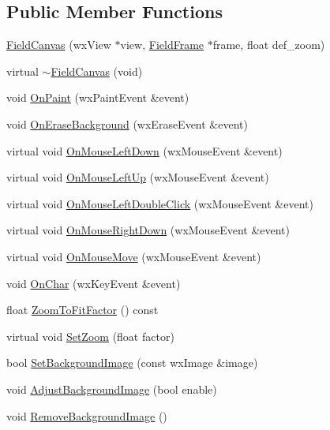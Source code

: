 \subsection*{Public Member Functions}
\begin{DoxyCompactItemize}
\item 
\hyperlink{a00101_a041189542b2fe164a1b1a13484cfdb3e}{Field\-Canvas} (wx\-View $\ast$view, \hyperlink{a00102}{Field\-Frame} $\ast$frame, float def\-\_\-zoom)
\item 
virtual \hyperlink{a00101_a69a815dd136fbc192be653bd561d9e45}{$\sim$\-Field\-Canvas} (void)
\item 
void \hyperlink{a00101_a0912d760e90bcd900ffcae4665b3dbd4}{On\-Paint} (wx\-Paint\-Event \&event)
\item 
void \hyperlink{a00101_a415abde6a22a5e8427dd6b274466b1fe}{On\-Erase\-Background} (wx\-Erase\-Event \&event)
\item 
virtual void \hyperlink{a00101_a1edd2bb8c1fe0356126cf6fb014d3611}{On\-Mouse\-Left\-Down} (wx\-Mouse\-Event \&event)
\item 
virtual void \hyperlink{a00101_a1e5d88baede48dc92fe2e904287f8a5b}{On\-Mouse\-Left\-Up} (wx\-Mouse\-Event \&event)
\item 
virtual void \hyperlink{a00101_a38d68c5f1458ac728df832ceb8ebda36}{On\-Mouse\-Left\-Double\-Click} (wx\-Mouse\-Event \&event)
\item 
virtual void \hyperlink{a00101_a0425e5b286913746da50af63000acab0}{On\-Mouse\-Right\-Down} (wx\-Mouse\-Event \&event)
\item 
virtual void \hyperlink{a00101_a990ffe3bd8a0402c60a3a497f4e66501}{On\-Mouse\-Move} (wx\-Mouse\-Event \&event)
\item 
void \hyperlink{a00101_a241ade9f268bcdfce766de8178aa7a9a}{On\-Char} (wx\-Key\-Event \&event)
\item 
float \hyperlink{a00101_abef5f32425f5f6a4c4623d161e36acec}{Zoom\-To\-Fit\-Factor} () const 
\item 
virtual void \hyperlink{a00101_ac4260b49b302d3d7009fad67ac1775de}{Set\-Zoom} (float factor)
\item 
bool \hyperlink{a00101_afdb191feba34784ac967d08755e44df5}{Set\-Background\-Image} (const wx\-Image \&image)
\item 
void \hyperlink{a00101_a75a40b62efa675cb92871bee42b43637}{Adjust\-Background\-Image} (bool enable)
\item 
void \hyperlink{a00101_ad164d99c8a4cf72038e532aaacc0cf9a}{Remove\-Background\-Image} ()
\item 

\end{DoxyCompactItemize}
